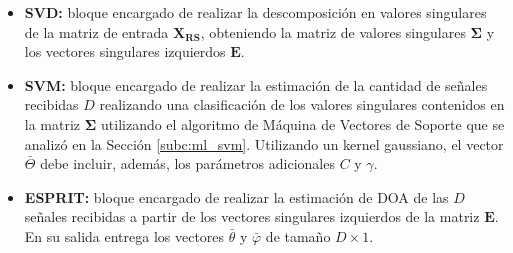 \begin{itemize}
    \item \textbf{SVD:} bloque encargado de realizar la descomposición en valores singulares de la matriz de entrada $\mathbf{X_{RS}}$, obteniendo la matriz de valores singulares $\mathbf{\Sigma}$ y los vectores singulares izquierdos $\mathbf{E}$.
    \item \textbf{SVM:} bloque encargado de realizar la estimación de la cantidad de señales recibidas $D$ realizando una clasificación de los valores singulares contenidos en la matriz $\mathbf{\Sigma}$ utilizando el algoritmo de Máquina de Vectores de Soporte que se analizó en la Sección \ref{subc:ml_svm}. Utilizando un kernel gaussiano, el vector $\bar{\Theta}$ debe incluir, además, los parámetros adicionales $C$ y $\gamma$.
    \item \textbf{ESPRIT:} bloque encargado de realizar la estimación de DOA de las $D$ señales recibidas a partir de los vectores singulares izquierdos de la matriz $\mathbf{E}$. En su salida entrega los vectores $\bar{\theta}$ y $\bar{\varphi}$ de tamaño $D\times 1$.
\end{itemize}

